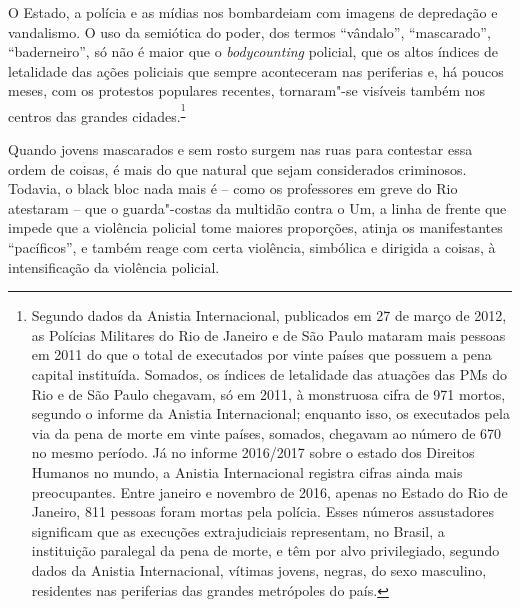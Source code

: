 O Estado, a polícia e as mídias nos bombardeiam com imagens de
depredação e vandalismo. O uso da semiótica do poder, dos termos
``vândalo'', ``mascarado'', ``baderneiro'', só não é maior que o
\emph{bodycounting} policial, que os altos índices de letalidade das
ações policiais que sempre aconteceram nas periferias e, há poucos
meses, com os protestos populares recentes, tornaram"-se visíveis também
nos centros das grandes cidades.\textsuperscript{\footnote{Segundo dados
  da Anistia Internacional, publicados em 27 de março de 2012, as
  Polícias Militares do Rio de Janeiro e de São Paulo mataram mais
  pessoas em 2011 do que o total de executados por vinte países que
  possuem a pena capital instituída. Somados, os índices de letalidade
  das atuações das PMs do Rio e de São Paulo chegavam, só em 2011, à
  monstruosa cifra de 971 mortos, segundo o informe da Anistia
  Internacional; enquanto isso, os executados pela via da pena de morte
  em vinte países, somados, chegavam ao número de 670 no mesmo período.
  Já no informe 2016/2017 sobre o estado dos Direitos Humanos no mundo,
  a Anistia Internacional registra cifras ainda mais preocupantes. Entre
  janeiro e novembro de 2016, apenas no Estado do Rio de Janeiro, 811
  pessoas foram mortas pela polícia. Esses números assustadores
  significam que as execuções extrajudiciais representam, no Brasil, a
  instituição paralegal da pena de morte, e têm por alvo privilegiado,
  segundo dados da Anistia Internacional, vítimas jovens, negras, do
  sexo masculino, residentes nas periferias das grandes metrópoles do
  país.}}

Quando jovens mascarados e sem rosto surgem nas ruas para contestar essa
ordem de coisas, é mais do que natural que sejam considerados
criminosos. Todavia, o black bloc nada mais é -- como os professores em
greve do Rio atestaram -- que o guarda"-costas da multidão contra o Um, a
linha de frente que impede que a violência policial tome maiores
proporções, atinja os manifestantes ``pacíficos'', e também reage com
certa violência, simbólica e dirigida a coisas, à intensificação da
violência policial.

